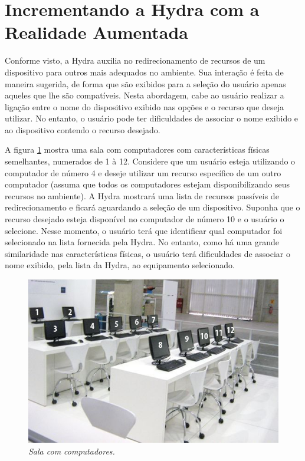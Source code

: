 \section{Incrementando a Hydra com a Realidade Aumentada}
\label{sec:arHydra}

	Conforme visto, a Hydra auxilia no redirecionamento de recursos de um dispositivo para outros mais
	adequados no ambiente. Sua interação é feita de maneira sugerida, de forma que são exibidos para a
	seleção do usuário apenas aqueles que lhe são compatíveis. Nesta abordagem, cabe ao usuário
	realizar a ligação entre o nome do dispositivo exibido nas opções e o recurso que deseja utilizar.	
	No entanto, o usuário pode ter dificuldades de associar o nome exibido e ao dispositivo contendo o
	recurso desejado.
	
	A figura \ref{fig:sala_computadores} mostra uma sala com computadores com características físicas
	semelhantes, numerados de 1 à 12. Considere que um usuário esteja utilizando o computador de
	número 4 e deseje utilizar um recurso específico de um outro computador (assuma que todos os
	computadores estejam disponibilizando seus recursos no ambiente). A Hydra mostrará uma lista de
	recursos passíveis de redirecionamento e ficará aguardando a seleção de um dispositivo. Suponha que o
	recurso desejado esteja disponível no computador de número 10 e o usuário o selecione. Nesse
	momento, o usuário terá que identificar qual computador foi selecionado na lista fornecida pela
	Hydra. No entanto, como há uma grande similaridade nas características físicas, o usuário terá
	dificuldades de associar o nome exibido, pela lista da Hydra, ao equipamento selecionado.
	
	\begin{figure}[htb]
		\centering \includegraphics[scale=0.65]{figuras/cap3/sala_computadores.png}
		\caption{\textit{Sala com computadores.}}
		\label{fig:sala_computadores} 
	\end{figure}


